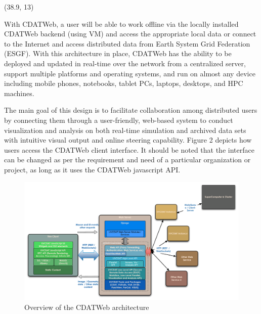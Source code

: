 \documentclass[a0,landscape]{a0poster}
\newenvironment{pcol}[1]{
  \begin{minipage}[t]{#1}
}{
  \end{minipage}
}
\begin{document}
\begin{textblock}{35}(38.9, 13)
\begin{pcol}{\threecolwidth}

With CDATWeb, a user will be able to work offline via the locally installed CDATWeb backend (using VM) and access the appropriate local data or connect to the Internet and access distributed data from Earth System Grid Federation (ESGF). With this architecture in place, CDATWeb has the ability to be deployed and updated in real-time over the network from a centralized server, support multiple platforms and operating systems, and run on almost any device including mobile phones, notebooks, tablet PCs, laptops, desktops, and HPC machines.

The main goal of this design is to facilitate collaboration among distributed users by connecting them through a user-friendly, web-based system to conduct visualization and analysis on both real-time simulation and archived data sets with intuitive visual output and online steering capability. Figure 2 depicts how users access the CDATWeb client interface. It should be noted that the interface can be changed as per the requirement and need of a particular organization or project, as long as it uses the CDATWeb javascript API.

\begin{figure}[overview]
\includegraphics[height=0.6\hsize]{images/Overview}
\caption{Overview of the CDATWeb architecture}
\end{figure}

\vspace{1cm}


\end{pcol}
\end{textblock}
\end{document}
